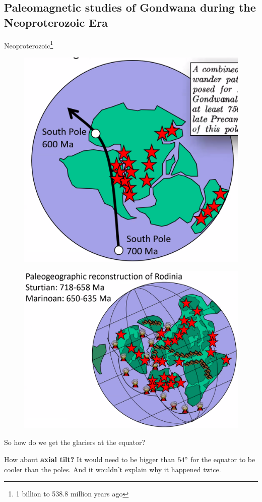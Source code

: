 \subsection{Paleomagnetic studies of Gondwana during the Neoproterozoic Era}
Neoproterozoic\footnote{1 billion to 538.8 million years ago}

\begin{figure}[H]
    \centering
    \includegraphics[width=0.75\linewidth]{content/img/gondwana.png}
\end{figure}

\begin{figure}[H]
    \centering
    \includegraphics[width=0.75\linewidth]{
    content/img/rodinia_snowball_earth.png}
\end{figure}

So how do we get the glaciers at the equator?

How about \textbf{axial tilt?} It would need to be bigger than $54 \degree$
for the equator to be cooler than the poles. And it wouldn't explain why it
happened twice.

